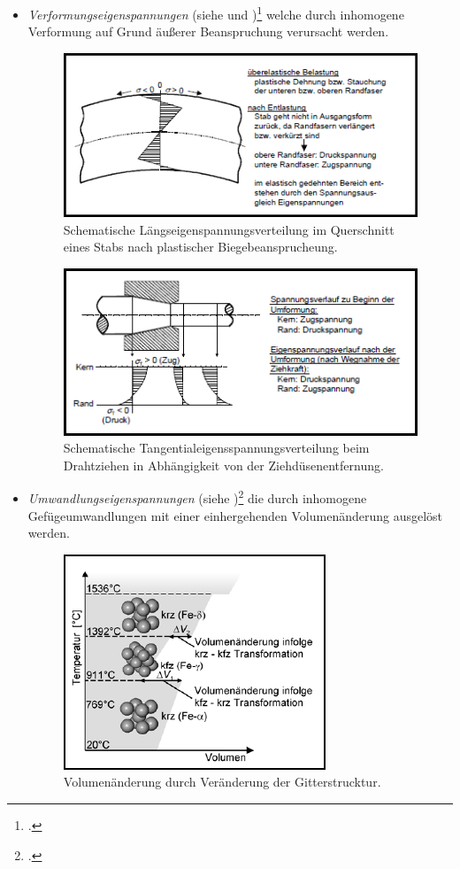\documentclass[12pt,a4paper,parskip]{scrartcl}
\begin{document}
\begin{itemize}
\item \emph{Verformungseigenspannungen} (siehe  und )\footcite[34]{hu} welche durch inhomogene Verformung auf Grund äußerer Beanspruchung verursacht werden.\begin{figure}[!htb]
  \centering
  \includegraphics[scale=1.3]{eigenspanfaser}
  \caption{Schematische Längseigenspannungsverteilung im Querschnitt eines Stabs nach plastischer Biegebeansprucheung.}
  \label{fig:eigenspanfaser}
  \end{figure}
  \begin{figure}[!htb]
  \centering
  \includegraphics[scale=1.35] {eigenspandrahtzieh}
  \caption{Schematische Tangentialeigensspannungsverteilung beim Drahtziehen in Abhängigkeit von der Ziehdüsenentfernung.}
  \label{fig:eigenspandrahtzieh}
  \end{figure}
\item \emph{Umwandlungseigenspannungen} (siehe )\footcite[35]{hu} die durch inhomogene Gefügeumwandlungen  
mit einer einhergehenden Volumenänderung ausgelöst werden.\begin{figure}[!htb]
  \centering
  \includegraphics[scale=1.8] {eigenspanmol}
  \caption{Volumenänderung durch Veränderung der Gitterstrucktur.}
  \label{fig:eigenspanmol}
  \end{figure}
\end{itemize}
\end{document}
